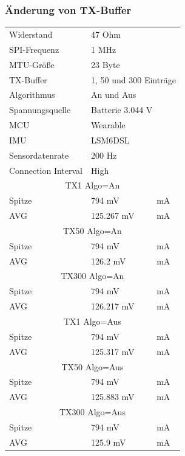 \subsubsection{Änderung von TX-Buffer}
\begin{minipage}{\linewidth}
	\label{tab:aaaaaaaaaaaaaaaa}
	\begin{tabularx}{\linewidth}{|l|l|X|}
		Widerstand & \multicolumn{2}{l|}{47 Ohm}\\
    SPI-Frequenz & \multicolumn{2}{l|}{1 MHz}\\
    MTU-Größe & \multicolumn{2}{l|}{23 Byte}\\
    TX-Buffer & \multicolumn{2}{l|}{1, 50 und 300 Einträge}\\
    Algorithmus & \multicolumn{2}{l|}{An und Aus}\\
    Spannungsquelle & \multicolumn{2}{l|}{Batterie 3.044 V}\\
    MCU & \multicolumn{2}{l|}{Wearable}\\
    IMU & \multicolumn{2}{l|}{LSM6DSL}\\
    Sensordatenrate & \multicolumn{2}{l|}{200 Hz}\\
    Connection Interval & \multicolumn{2}{l|}{High}\\
    \hline
    \multicolumn{3}{|c|}{TX1 Algo=An}\\
    Spitze & 794 mV & mA\\
    AVG & 125.267 mV & mA\\
    \hline
    \multicolumn{3}{|c|}{TX50 Algo=An}\\
    Spitze & 794 mV & mA\\
    AVG & 126.2 mV & mA\\
    \hline
    \multicolumn{3}{|c|}{TX300 Algo=An}\\
    Spitze & 794 mV & mA\\
    AVG & 126.217 mV & mA\\
    \hline
    \multicolumn{3}{|c|}{TX1 Algo=Aus}\\
    Spitze & 794 mV & mA\\
    AVG & 125.317 mV & mA\\
    \hline
    \multicolumn{3}{|c|}{TX50 Algo=Aus}\\
    Spitze & 794 mV & mA\\
    AVG & 125.883 mV & mA\\
    \hline
    \multicolumn{3}{|c|}{TX300 Algo=Aus}\\
    Spitze & 794 mV & mA\\
    AVG & 125.9 mV & mA\\
  \end{tabularx}
\end{minipage}\\\\

